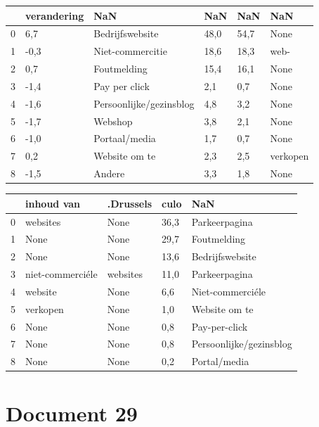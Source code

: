\begin{tabular}{llllll}
\toprule
{} & verandering &                      NaN &   NaN &   NaN &       NaN \\
\midrule
0 &         6,7 &          Bedrijfswebsite &  48,0 &  54,7 &      None \\
1 &        -0,3 &         Niet-commercitie &  18,6 &  18,3 &      web- \\
2 &         0,7 &              Foutmelding &  15,4 &  16,1 &      None \\
3 &        -1,4 &            Pay per click &   2,1 &   0,7 &      None \\
4 &        -1,6 &  Persoonlijke/gezinsblog &   4,8 &   3,2 &      None \\
5 &        -1,7 &                  Webshop &   3,8 &   2,1 &      None \\
6 &        -1,0 &            Portaal/media &   1,7 &   0,7 &      None \\
7 &         0,2 &            Website om te &   2,3 &   2,5 &  verkopen \\
8 &        -1,5 &                   Andere &   3,3 &   1,8 &      None \\
\bottomrule
\end{tabular}

\begin{tabular}{lllll}
\toprule
{} &        inhoud van & .Drussels &  culo &                      NaN \\
\midrule
0 &          websites &      None &  36,3 &            Parkeerpagina \\
1 &              None &      None &  29,7 &              Foutmelding \\
2 &              None &      None &  13,6 &          Bedrijfswebsite \\
3 &  niet-commerciéle &  websites &  11,0 &            Parkeerpagina \\
4 &           website &      None &   6,6 &         Niet-commerciéle \\
5 &          verkopen &      None &   1,0 &            Website om te \\
6 &              None &      None &   0,8 &            Pay-per-click \\
7 &              None &      None &   0,8 &  Persoonlijke/gezinsblog \\
8 &              None &      None &   0,2 &             Portal/media \\
\bottomrule
\end{tabular}
\section{Document 29}


